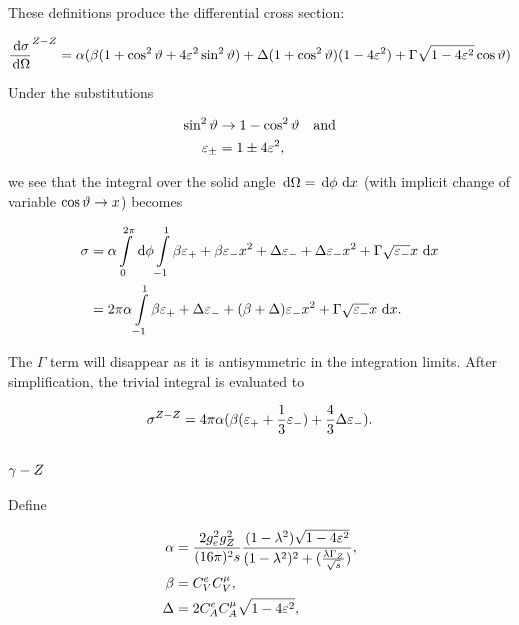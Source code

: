 \documentclass[]{report}
\begin{document}
These definitions produce the differential cross section:

$$
\frac{\,\operatorname{d}\!{\sigma}}{\,\operatorname{d}\!{\Omega}}^{Z -Z }
  = \alpha(\beta(1+\cos^{2}{\vartheta}+4\varepsilon^{2}\sin^{2}{\vartheta})
    + \Delta(1+\cos^{2}{\vartheta})(1-4\varepsilon^{2})
    + \Gamma\sqrt{1-4\varepsilon^{2}}\cos{\vartheta}
  )
$$

Under the substitutions

\begin{align*}
\sin^{2}{\vartheta} &\rightarrow 1-\cos^{2}{\vartheta} \quad\text{and}\\
\varepsilon_{\pm} &= 1\pm4\varepsilon^{2},
\end{align*}

we see that the integral over the solid angle $\,\operatorname{d}\!{\Omega} = \,\operatorname{d}\!{\phi}\,\operatorname{d}\!{x}$ (with implicit change of variable $\cos{\vartheta}\rightarrow x$) becomes

\begin{align*}
\sigma &= \alpha\int\limits_{0}^{2\pi}\d{\phi}\int\limits_{-1}^{1}
  \beta\varepsilon_{+} + \beta\varepsilon_{-}x^{2} + \Delta\varepsilon_{-}
  + \Delta\varepsilon_{-}x^{2} + \Gamma\sqrt{\varepsilon_{-}}x
  \d{x}
  \\
  &= 2\pi\alpha\int\limits_{-1}^{1}
    \beta\varepsilon_{+} + \Delta\varepsilon_{-} + (\beta + \Delta)\varepsilon_{-}x^{2}
    + \Gamma\sqrt{\varepsilon_{-}}x
    \d{x}.
\end{align*}

The $\Gamma$ term will disappear as it is antisymmetric in the integration limits. After simplification, the trivial integral is evaluated to

$$
\sigma^{\Zzero-\Zzero} = 4\pi\alpha(\beta(\varepsilon_{+} + \frac{1}{3}\varepsilon_{-})
  + \frac{4}{3}\Delta\varepsilon_{-}).
$$

\subsection{$\gamma-Z $}

Define

\begin{align*}
\alpha &= \frac{2g_{e}^{2}g_{\Zzero}^{2}}{(16\pi)^{2}s} \frac{(1-\lambda^{2})\sqrt{1-4\varepsilon^{2}}}{(1-\lambda^{2})^{2} + (\frac{\lambda\Gamma_{\Zzero}}{\rts})},
\\
\beta &= C^{e}_{V}C^{\mu}_{V},
\\
\Delta &= 2C^{e}_{A}C^{\mu}_{A}\sqrt{1-4\varepsilon^{2}},
\end	{align*}
\end{document}

